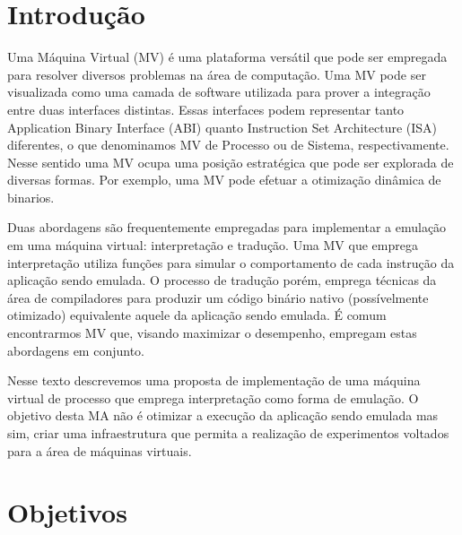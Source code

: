 \documentclass[11pt,twoside]{article}
\begin{document}
\section{Introdução}

Uma Máquina Virtual (MV) é uma plataforma versátil que pode ser empregada 
para resolver diversos problemas na área de computação. Uma MV pode ser 
visualizada como uma camada de software utilizada para prover a integração
entre duas interfaces distintas. Essas interfaces podem representar tanto
Application Binary Interface (ABI) quanto Instruction Set Architecture (ISA) 
diferentes, o que denominamos MV de Processo ou de Sistema, respectivamente. 
Nesse sentido uma MV ocupa uma posição estratégica que pode ser explorada de 
diversas formas. Por exemplo, uma MV pode efetuar a otimização dinâmica de 
binarios.

Duas abordagens são frequentemente empregadas para implementar a emulação
em uma máquina virtual: interpretação e tradução. Uma MV que emprega 
interpretação utiliza funções para simular o comportamento de cada instrução
da aplicação sendo emulada. O processo de tradução porém, emprega técnicas
da área de compiladores para produzir um código binário nativo (possívelmente
otimizado) equivalente aquele da aplicação sendo emulada. É comum encontrarmos 
MV que, visando maximizar o desempenho, empregam estas abordagens em conjunto.

Nesse texto descrevemos uma proposta de implementação de uma máquina virtual
de processo que emprega interpretação como forma de emulação. O objetivo desta
MA não é otimizar a execução da aplicação sendo emulada mas sim, criar uma
infraestrutura que permita a realização de experimentos voltados para a área
de máquinas virtuais.



   
\section{Objetivos}
% 
\end{document}
